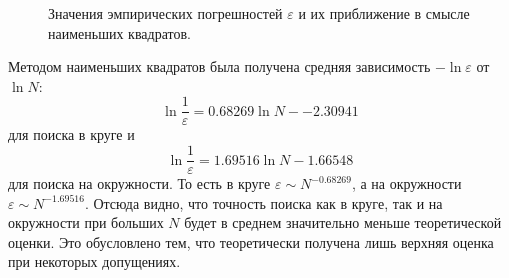 \documentclass[12pt, a4paper]{article}
\begin{document}
\begin{figure}[H]
\caption{Значения эмпирических погрешностей $\varepsilon$ и их приближение в смысле наименьших квадратов.}
\end{figure}

Методом наименьших квадратов была получена средняя зависимость $-\ln\varepsilon$ от $\ln N$:
\[ \ln{\frac 1\varepsilon} = 0.68269\ln N - -2.30941 \]
для поиска в круге и 
\[ \ln{\frac 1\varepsilon} = 1.69516\ln N - 1.66548 \]
для поиска на окружности. То есть в круге $\varepsilon \sim N^{-0.68269}$, а на окружности $\varepsilon \sim N^{-1.69516}$. Отсюда видно, что точность поиска как в круге, так и на окружности при больших $N$ будет в среднем значительно меньше теоретической оценки. Это обусловлено тем, что теоретически получена лишь верхняя оценка при некоторых допущениях.
\end{document}
